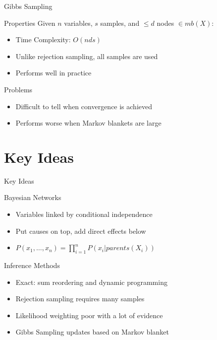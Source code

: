 \documentclass[14pt]{beamer}
\begin{document}
\begin{frame}{Gibbs Sampling}
	\begin{block}{Properties}
		Given $n$ variables, $s$ samples, and $\leq d$ nodes $\in \textit{mb}(X)$:
		\begin{itemize}
			\item Time Complexity: \pause $O(nds)$
			\pause
			\item Unlike rejection sampling, all samples are used
			\pause
			\item Performs well in practice
		\end{itemize}
	\end{block}
	\pause
	\begin{block}{Problems}
		\begin{itemize}
			\item Difficult to tell when convergence is achieved
			\item Performs worse when Markov blankets are large
		\end{itemize}
	\end{block}
\end{frame}


\part{Key Ideas}
\begin{frame}{Key Ideas}
	\begin{block}{Bayesian Networks}
		\begin{itemize}
			\item Variables linked by conditional independence
			\item Put causes on top, add direct effects below
			\item $P(x_{1},\ldots,x_{n}) = \prod\limits_{i=1}^{n}{P(x_{i}|\textit{parents}(X_{i}))}$
		\end{itemize}
	\end{block}
	\begin{block}{Inference Methods}
		\begin{itemize}
			\item Exact: sum reordering and dynamic programming
			\item Rejection sampling requires many samples
			\item Likelihood weighting poor with a lot of evidence
			\item Gibbs Sampling updates based on Markov blanket
		\end{itemize}
	\end{block}
\end{frame}
\end{document}
